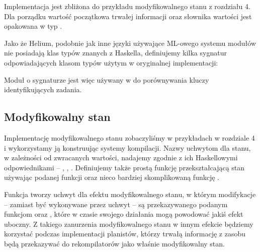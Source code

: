 

Implementacja jest zbliżona do przykładu modyfikowalnego stanu z rozdziału 4. Dla porządku wartość początkowa trwałej informacji oraz słownika wartości jest opakowana w typ .

Jako że Helium, podobnie jak inne języki używające ML-owego systemu modułów nie posiadają klas typów znanych z Haskella, definiujemy kilka sygnatur odpowiadających klasom typów użytym w oryginalnej implementacji:

\begin{minipage}[t]{.45\textwidth}

  

\end{minipage}\hfill
\begin{minipage}[t]{.45\textwidth}

  

\end{minipage}

Moduł o sygnaturze  jest więc używany w  do porównywania kluczy identyfikujących zadania.

\subsection{Modyfikowalny stan}

Implementację modyfikowalnego stanu zobaczyliśmy w przykładach w rozdziale 4 i wykorzystamy ją konstruując systemy kompilacji. Nazwy uchwytom dla stanu, w zależności od zwracanych wartości, nadajemy zgodnie z ich Haskellowymi odpowiednikami -- , , . Definiujemy także prostą funkcję  przekształcającą stan używając podanej funkcji oraz nieco bardziej skomplikowaną funkcję .



Funkcja  tworzy uchwyt dla efektu modyfikowalnego stanu, w którym modifykacje -- zamiast być wykonywane przez uchwyt -- są przekazywanego podanym funkcjom  oraz , które w czasie swojego działania mogą powodować jakiś efekt uboczny. Z takiego zanurzenia modyfikowalnego stanu w innym efekcie będziemy korzystać podczas implementacji planistów, którzy trwałą informację z zasobu będą przekazywać do rekompilatorów jako właśnie modyfikowalny stan.

